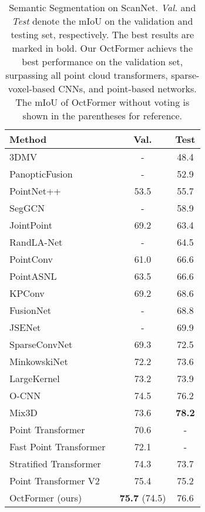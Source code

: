 \documentclass[acmtog,screen,authorversion]{acmart}
\newcommand{\tb}[1]{\textbf{#1}}
\newcommand{\tablestyle}[2]{\setlength{\tabcolsep}{#1}
                            \renewcommand{\arraystretch}{#2}
                            \centering
                            \footnotesize}
\begin{document}
\begin{table}[t]
\centering
\tablestyle{8pt}{1.1}
\caption{Semantic Segmentation on ScanNet. 
\emph{Val.} and \emph{Test} denote the mIoU on the validation and testing set, respectively. The best results are marked in bold.
Our OctFormer achievs the best performance on the validation set, surpassing all point cloud transformers, sparse-voxel-based CNNs, and point-based networks. The mIoU of OctFormer without voting is shown in the parentheses for reference.
}
\begin{tabular}{l|cc}
  \toprule
  Method                                      & Val.          & Test       \\
  \midrule
3DMV~\cite{Dai2018a}                        & -             & 48.4       \\
  PanopticFusion~\cite{Narita2019}            & -             & 52.9       \\
  PointNet++~\cite{Qi2017}                    & 53.5          & 55.7       \\
  SegGCN~\cite{Lei2020a}                      & -             & 58.9       \\
  JointPoint~\cite{Chiang2019}                & 69.2          & 63.4       \\
  RandLA-Net~\cite{Hu2019}                    & -             & 64.5       \\
  PointConv~\cite{Wu2019a}                    & 61.0          & 66.6       \\
  PointASNL~\cite{Yan2020a}                   & 63.5          & 66.6       \\
  KPConv~\cite{Thomas2019}                    & 69.2          & 68.6       \\
  FusionNet~\cite{Zhang2020}                  & -             & 68.8       \\
  JSENet~\cite{Hu2020}                        & -             & 69.9       \\
  SparseConvNet~\cite{Graham2018}             & 69.3          & 72.5       \\
  MinkowskiNet~\cite{Choy2019}                & 72.2          & 73.6       \\
  LargeKernel~\cite{Chen2022}                 & 73.2          & 73.9       \\
  O-CNN~\cite{Wang2017}                       & 74.5          & 76.2       \\
  Mix3D~\cite{Nekrasov2021}                   & 73.6          & \tb{78.2}  \\
  \midrule
  Point Transformer~\cite{Zhao2021}           & 70.6          & -          \\
  Fast Point Transformer~\cite{Zhao2021}      & 72.1          & -          \\
  Stratified Transformer~\cite{Lai2022}       & 74.3          & 73.7       \\
  Point Transformer V2~\cite{Wu2022}          & 75.4          & 75.2       \\
  OctFormer (ours)                            & \tb{75.7} (74.5)     & 76.6  \\
  \bottomrule
\end{tabular}
\label{tab:scannetv2}
\end{table}
 
\end{document}
